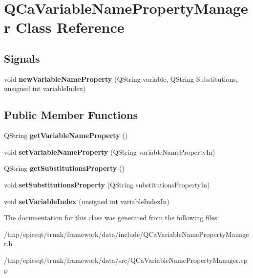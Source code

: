 \hypertarget{classQCaVariableNamePropertyManager}{
\section{QCaVariableNamePropertyManager Class Reference}
\label{classQCaVariableNamePropertyManager}
}
\subsection*{Signals}
\begin{DoxyCompactItemize}
\item 
\hypertarget{classQCaVariableNamePropertyManager_a72fe4228e021da747d87114c2c1e66cb}{
void {\bfseries newVariableNameProperty} (QString variable, QString Substitutions, unsigned int variableIndex)}
\label{classQCaVariableNamePropertyManager_a72fe4228e021da747d87114c2c1e66cb}

\end{DoxyCompactItemize}
\subsection*{Public Member Functions}
\begin{DoxyCompactItemize}
\item 
\hypertarget{classQCaVariableNamePropertyManager_ac284e8d6f09e8111edad88389f9b861a}{
QString {\bfseries getVariableNameProperty} ()}
\label{classQCaVariableNamePropertyManager_ac284e8d6f09e8111edad88389f9b861a}

\item 
\hypertarget{classQCaVariableNamePropertyManager_a3207418f259b69422cfaa2ababa594ba}{
void {\bfseries setVariableNameProperty} (QString variableNamePropertyIn)}
\label{classQCaVariableNamePropertyManager_a3207418f259b69422cfaa2ababa594ba}

\item 
\hypertarget{classQCaVariableNamePropertyManager_a022d4dc9da0944490c23acc2730ba03c}{
QString {\bfseries getSubstitutionsProperty} ()}
\label{classQCaVariableNamePropertyManager_a022d4dc9da0944490c23acc2730ba03c}

\item 
\hypertarget{classQCaVariableNamePropertyManager_a7f0a15766eccf9a886abd8a494a665d7}{
void {\bfseries setSubstitutionsProperty} (QString substitutionsPropertyIn)}
\label{classQCaVariableNamePropertyManager_a7f0a15766eccf9a886abd8a494a665d7}

\item 
\hypertarget{classQCaVariableNamePropertyManager_a90a3e84be54e7d56d875b23310c44e0a}{
void {\bfseries setVariableIndex} (unsigned int variableIndexIn)}
\label{classQCaVariableNamePropertyManager_a90a3e84be54e7d56d875b23310c44e0a}

\end{DoxyCompactItemize}


The documentation for this class was generated from the following files:\begin{DoxyCompactItemize}
\item 
/tmp/epicsqt/trunk/framework/data/include/QCaVariableNamePropertyManager.h\item 
/tmp/epicsqt/trunk/framework/data/src/QCaVariableNamePropertyManager.cpp\end{DoxyCompactItemize}

